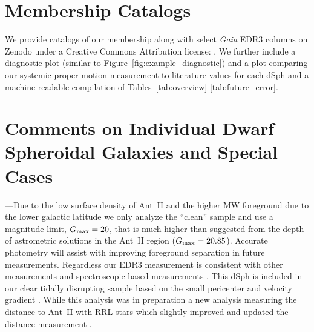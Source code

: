 \documentclass[twocolumn]{aastex63}
\begin{document}
\vspace{5mm}










{}


%

\appendix

\section{Membership Catalogs}
\label{appendix:membership}

We provide catalogs of our membership along with select {\it Gaia} EDR3 columns {on Zenodo under a Creative Commons Attribution license: }. We further include a diagnostic plot (similar to Figure~\ref{fig:example_diagnostic}) and a plot comparing our systemic proper motion measurement to literature values for each dSph and a machine readable compilation  of Tables~\ref{tab:overview}-\ref{tab:future_error}. 




\section{Comments on Individual Dwarf Spheroidal Galaxies and Special Cases}
\label{appendix:comments}



---Due to the low surface density of Ant~II and the higher MW foreground due to the lower galactic latitude we only analyze the ``clean'' sample and use a magnitude limit, $G_{\rm max}=20$, that is much higher than suggested from the depth of astrometric solutions in the Ant~II region ($G_{\rm max}=20.85$).  Accurate photometry will assist with improving foreground separation in future measurements. 
Regardless our EDR3 measurement is consistent with other measurements \citep{McConnachie2020RNAAS...4..229M, Battaglia2022A&A...657A..54B} and spectroscopic based measurements \citep{Ji2021ApJ...921...32J}.
This dSph is included in our clear tidally disrupting sample based on the small pericenter and velocity gradient \citep{Torrealba2019MNRAS.488.2743T, Ji2021ApJ...921...32J}. 
While this analysis was in preparation a new analysis measuring the distance to Ant~II with RRL stars which slightly improved and updated the distance measurement \citep{Vivas2022ApJ...926...78V}. 
\end{document}
